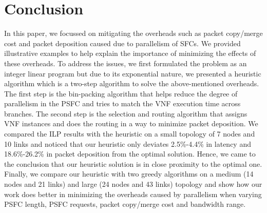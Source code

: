 \documentclass[journal]{IEEEtran}
\begin{document}
\section{Conclusion}
In this paper, we focussed on mitigating the overheads such as packet copy/merge cost and packet deposition caused due to parallelism of SFCs. We provided illustrative examples to help explain the importance of minimizing the effects of these overheads. To address the issues, we first formulated the problem as an integer linear program but due to its exponential nature, we presented a heuristic algorithm which is a two-step algorithm to solve the above-mentioned overheads. The first step is the bin-packing algorithm that helps reduce the degree of parallelism in the PSFC and tries to match the VNF execution time across branches. The second step is the selection and routing algorithm that assigns VNF instances and does the routing in a way to minimize packet deposition. We compared the ILP results with the heuristic on a small topology of 7 nodes and 10 links and noticed that our heuristic only deviates 2.5\%-4.4\% in latency and 18.6\%-26.2\% in packet deposition from the optimal solution. Hence, we came to the conclusion that our heuristic solution is in close proximity to the optimal one. Finally, we compare our heuristic with two greedy algorithms on a medium (14 nodes and 21 links) and large (24 nodes and 43 links) topology and show how our work does better in minimizing the overheads caused by parallelism when varying PSFC length, PSFC requests, packet copy/merge cost and bandwidth range.



%



%

\end{document}
